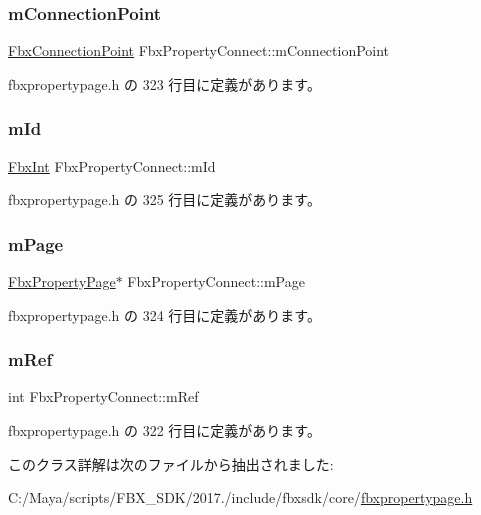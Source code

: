 \subsubsection{\texorpdfstring{m\+Connection\+Point}{mConnectionPoint}}
{\footnotesize\ttfamily \hyperlink{class_fbx_connection_point}{Fbx\+Connection\+Point} Fbx\+Property\+Connect\+::m\+Connection\+Point}



 fbxpropertypage.\+h の 323 行目に定義があります。

\mbox{\label{class_fbx_property_connect_abce4165e9ad7ed40341d8988763f083c}} 
\subsubsection{\texorpdfstring{m\+Id}{mId}}
{\footnotesize\ttfamily \hyperlink{fbxtypes_8h_a088fa96de3b0b3ea69f0f6afef525dfb}{Fbx\+Int} Fbx\+Property\+Connect\+::m\+Id}



 fbxpropertypage.\+h の 325 行目に定義があります。

\mbox{\label{class_fbx_property_connect_a08654feca214b0f552c333115c6264fe}} 
\subsubsection{\texorpdfstring{m\+Page}{mPage}}
{\footnotesize\ttfamily \hyperlink{class_fbx_property_page}{Fbx\+Property\+Page}$\ast$ Fbx\+Property\+Connect\+::m\+Page}



 fbxpropertypage.\+h の 324 行目に定義があります。

\mbox{\label{class_fbx_property_connect_a4bc3cc9dabbd6ffb4e25ab37b84f80b4}} 
\subsubsection{\texorpdfstring{m\+Ref}{mRef}}
{\footnotesize\ttfamily int Fbx\+Property\+Connect\+::m\+Ref}



 fbxpropertypage.\+h の 322 行目に定義があります。



このクラス詳解は次のファイルから抽出されました\+:\begin{DoxyCompactItemize}
\item 
C\+:/\+Maya/scripts/\+F\+B\+X\+\_\+\+S\+D\+K/2017./include/fbxsdk/core/\hyperlink{fbxpropertypage_8h}{fbxpropertypage.\+h}\end{DoxyCompactItemize}
